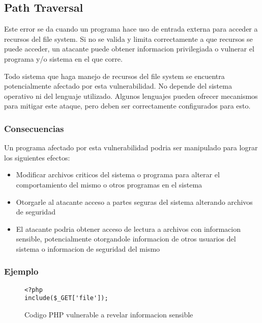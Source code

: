 \subsection{Path Traversal}

Este error se da cuando un programa hace uso de entrada externa para acceder a recursos del file system.
Si no se valida y limita correctamente a que recursos se puede acceder, un atacante puede obtener informacion privilegiada o vulnerar el programa y/o sistema en el que corre.

Todo sistema que haga manejo de recursos del file system se encuentra potencialmente afectado por esta vulnerabilidad.
No depende del sistema operativo ni del lenguaje utilizado.
Algunos lenguajes pueden ofrecer mecanismos para mitigar este ataque, pero deben ser correctamente configurados para esto.

\subsubsection{Consecuencias}

Un programa afectado por esta vulnerabilidad podria ser manipulado para lograr los siguientes efectos:

\begin{itemize}

    \item Modificar archivos criticos del sistema o programa para alterar el comportamiento del mismo o otros programas en el sistema

    \item Otorgarle al atacante acceso a partes seguras del sistema alterando archivos de seguridad

    \item El atacante podria obtener acceso de lectura a archivos con informacion sensible, potencialmente otorgandole informacion de otros usuarios del sistema o informacion de seguridad del mismo

\end{itemize}

\subsubsection{Ejemplo}

\begin{figure}[H]

    \begin{verbatim}
<?php
include($_GET['file']);
    \end{verbatim}

    \caption{Codigo PHP vulnerable a revelar informacion sensible}
    \label{code:php-traversal}

\end{figure}

